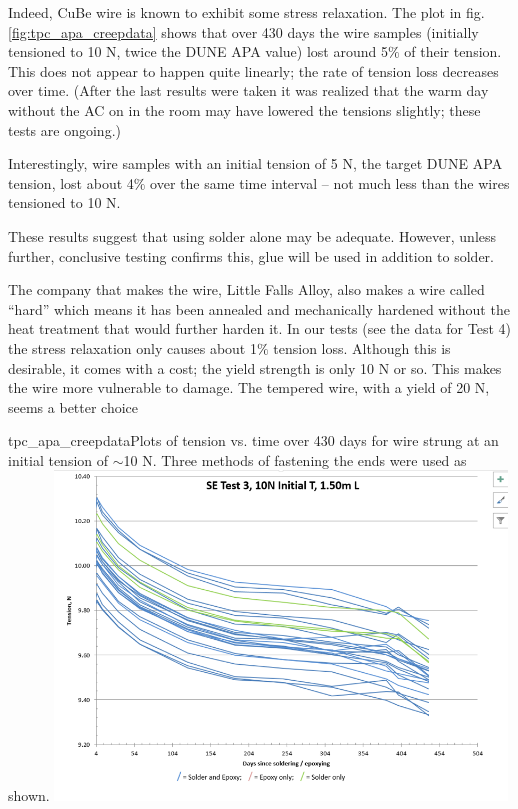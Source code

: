 Indeed, CuBe wire is known to exhibit some stress relaxation.  The plot in fig. \ref{fig:tpc_apa_creepdata} shows that over 430 days the wire samples (initially tensioned to 10 N, twice the DUNE APA value) lost around 5$\%$ of their tension.  This does not appear to happen quite linearly; the rate of tension loss decreases over time.  (After the last results were taken it was realized that the warm day without the AC on in the room may have lowered the tensions slightly; these tests are ongoing.)

Interestingly, wire samples with an initial tension of 5 N, the target DUNE APA tension, lost about 4$\%$ over the same time interval -- not much less than the wires tensioned to 10 N. 

These results suggest that using solder alone may be adequate.  However, unless further, conclusive testing confirms this, glue will be used in addition to solder. 

The company that makes the wire, Little Falls Alloy, also makes a wire called ``hard'' which means it has been annealed and mechanically hardened without the heat treatment that would further harden it.  In our tests (see the data for Test 4) the stress relaxation only causes about 1$\%$ tension loss.  Although this is desirable, it comes with a cost; the yield strength is only 10 N or so.  This makes the wire more vulnerable to damage.  The tempered wire, with a yield of 20 N, seems a better choice

\begin{cdrfigure}{tpc_apa_creepdata}{Plots of tension vs. time over 430 days for wire strung at an initial tension of $\sim$10 N.  Three methods of fastening the ends were used as shown.}
\includegraphics[width=0.9\textwidth]{figures/tpc_apa_creepdata.png} 
\end{cdrfigure}

